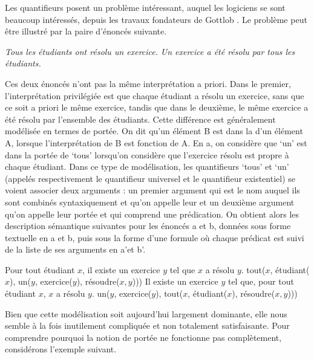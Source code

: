 {Les quantifieurs posent un problème intéressant, auquel les logiciens se sont beaucoup intéressés, depuis les travaux fondateurs de Gottlob \citet{frege1892uber}. Le problème peut être illustré par la paire d’énoncés suivante.

\ea\label{ex:13-portée}
\ea \textit{Tous les étudiants ont résolu un exercice.}
\ex \textit{Un exercice a été résolu par tous les étudiants.}\z\z

Ces deux énoncés n’ont pas la même interprétation a priori. Dans le premier, l’interprétation privilégiée est que chaque étudiant a résolu un exercice, sans que ce soit a priori le même exercice, tandis que dans le deuxième, le même exercice a été résolu par l’ensemble des étudiants. Cette différence est généralement modélisée en termes de portée. On dit qu’un élément B est dans la  d’un élément A, lorsque l’interprétation de B est fonction de A. En a, on considère que ‘un’ est dans la portée de ‘tous’ lorsqu’on considère que l’exercice résolu est propre à chaque étudiant. Dans ce type de modélisation, les quantifieurs ‘tous’ et ‘un’ (appelés respectivement le quantifieur universel et le quantifieur existentiel) se voient associer deux arguments : un premier argument qui est le nom auquel ils sont combinés syntaxiquement et qu’on appelle leur  et un deuxième argument qu’on appelle leur portée et qui comprend une prédication. On obtient alors les description sémantique suivantes pour les énoncés a et b, données sous forme textuelle en a et b, puis sous la forme d’une formule où chaque prédicat est suivi de la liste de ses arguments en a’et b’.


\begin{exe}\label{ex:13-scope}
    \ex
	\begin{xlist}[b'.]
		 Pour tout étudiant $x$, il existe un exercice $y$ tel que $x$ a résolu $y$.
		 tout($x$, étudiant($x$), un($y$, exercice($y$), résoudre($x,y$)))
		 Il existe un exercice $y$ tel que, pour tout étudiant $x$, $x$ a résolu $y$.
		 un($y$, exercice($y$), tout($x$, étudiant($x$), résoudre($x,y$)))
	\end{xlist}	
\end{exe}

Bien que cette modélisation soit aujourd’hui largement dominante, elle nous semble à la fois inutilement compliquée et non totalement satisfaisante. Pour comprendre pourquoi la notion de portée ne fonctionne pas complètement, considérons l’exemple suivant.

}
